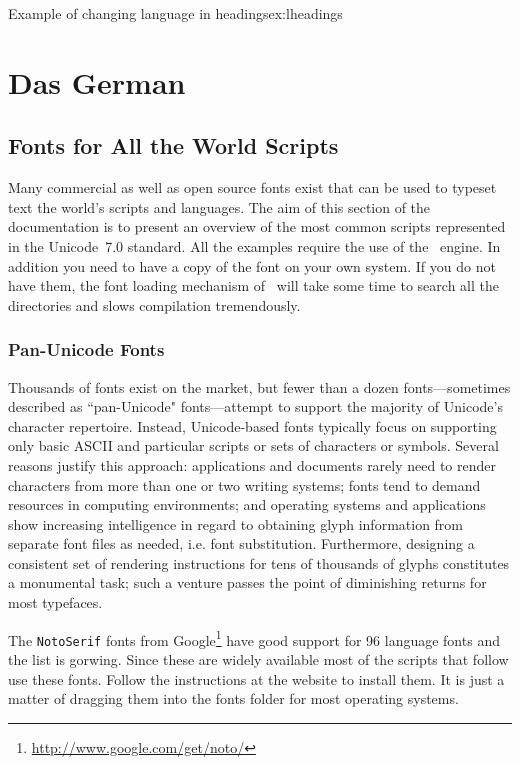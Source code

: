 \begin{texexample}{Example of changing language in headings}{ex:lheadings}
\chapter{Das German}          
\end{texexample}


\section{Fonts for All the World Scripts}

Many commercial as well as open source fonts exist that can be used to typeset text the world's scripts and languages. The aim of this section of the documentation is to present an overview of the most common scripts represented in the Unicode~7.0 standard. All the examples require the use of the \XeTeX\ engine. In addition you need to have a copy of the font on your own system. If you do not have them, the font loading mechanism of \XeTeX\ will take some time to search all the directories and slows compilation tremendously. 

\subsection{Pan-Unicode Fonts}

Thousands of fonts exist on the market, but fewer than a dozen fonts—sometimes described as ``pan-Unicode" fonts—attempt to support the majority of Unicode's character repertoire. Instead, Unicode-based fonts typically focus on supporting only basic ASCII and particular scripts or sets of characters or symbols. Several reasons justify this approach: applications and documents rarely need to render characters from more than one or two writing systems; fonts tend to demand resources in computing environments; and operating systems and applications show increasing intelligence in regard to obtaining glyph information from separate font files as needed, i.e. font substitution. Furthermore, designing a consistent set of rendering instructions for tens of thousands of glyphs constitutes a monumental task; such a venture passes the point of diminishing returns for most typefaces.

The \texttt{NotoSerif} fonts from Google\footnote{\protect\url{http://www.google.com/get/noto/}} have good support for 96 language fonts and the list is gorwing. Since these are widely available most of the scripts that follow use these fonts. Follow the instructions at the website to install them. It is just a matter of dragging them into the fonts folder for most operating systems.

